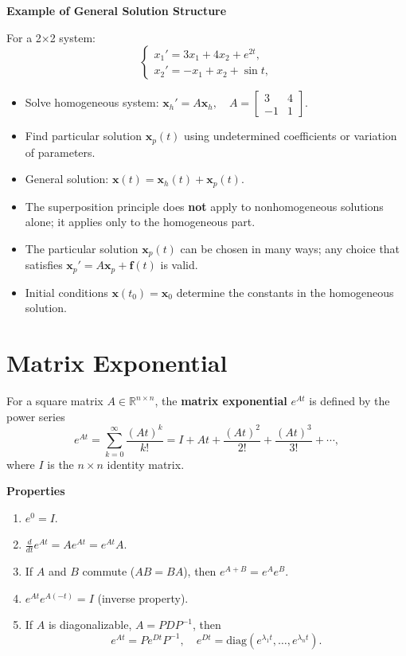     \textbf{Example of General Solution Structure}

    For a 2×2 system:
    \[
    \begin{cases}
    x_1' = 3 x_1 + 4 x_2 + e^{2t},\\
    x_2' = -x_1 + x_2 + \sin t,
    \end{cases}
    \]

    \begin{itemize}
      \item Solve homogeneous system:
      \(\mathbf{x}_h' = A \mathbf{x}_h, \quad A = \begin{bmatrix}3 & 4 \\ -1 & 1\end{bmatrix}\).
      \item Find particular solution $\mathbf{x}_p(t)$ using undetermined coefficients or variation of parameters.
      \item General solution: \(\mathbf{x}(t) = \mathbf{x}_h(t) + \mathbf{x}_p(t)\).
    \end{itemize}


    \begin{itemize}
      \item The superposition principle does \textbf{not} apply to nonhomogeneous solutions alone; it applies only to the homogeneous part.
      \item The particular solution $\mathbf{x}_p(t)$ can be chosen in many ways; any choice that satisfies $\mathbf{x}_p' = A\mathbf{x}_p + \mathbf{f}(t)$ is valid.
      \item Initial conditions $\mathbf{x}(t_0) = \mathbf{x}_0$ determine the constants in the homogeneous solution.
    \end{itemize}


  \section{Matrix Exponential}
    \begin{definition}
      For a square matrix $A \in \mathbb{R}^{n \times n}$, the \textbf{matrix exponential} $e^{At}$ is defined by the power series
      \[
      e^{At} = \sum_{k=0}^{\infty} \frac{(At)^k}{k!} = I + At + \frac{(At)^2}{2!} + \frac{(At)^3}{3!} + \cdots,
      \]
      where $I$ is the $n \times n$ identity matrix.
    \end{definition}
    

    \textbf{Properties}
    \begin{enumerate}
        \item $e^{0} = I$.
        \item $\frac{d}{dt} e^{At} = A e^{At} = e^{At} A$.
        \item If $A$ and $B$ commute ($AB = BA$), then $e^{A+B} = e^A e^B$.
        \item $e^{At} e^{A(-t)} = I$ (inverse property).
        \item If $A$ is diagonalizable, $A = PDP^{-1}$, then
        \[
        e^{At} = P e^{Dt} P^{-1}, \quad e^{Dt} = \text{diag}(e^{\lambda_1 t},\dots,e^{\lambda_n t}).
        \]
    \end{enumerate}

